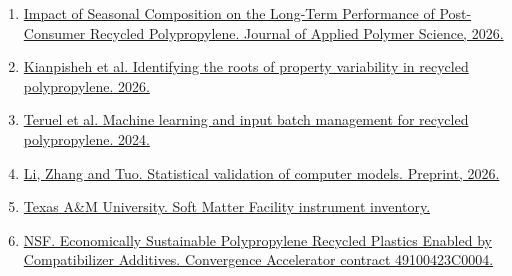 \documentclass[11pt,letterpaper]{article}
\begin{document}
\begin{enumerate}
\small\setlength{\itemsep}{0pt}
\item \href{https://doi.org/10.1002/app.70501}{Impact of Seasonal Composition on the Long-Term Performance of Post-Consumer Recycled Polypropylene. Journal of Applied Polymer Science, 2026.}
\item \href{https://doi.org/10.1016/j.wasman.2026.115586}{Kianpisheh et al. Identifying the roots of property variability in recycled polypropylene. 2026.}
\item \href{https://doi.org/10.1016/j.jclepro.2023.140390}{Teruel et al. Machine learning and input batch management for recycled polypropylene. 2024.}
\item \href{https://arxiv.org/abs/2604.17144}{Li, Zhang and Tuo. Statistical validation of computer models. Preprint, 2026.}
\item \href{https://somf.engr.tamu.edu/instruments/}{Texas A\&M University. Soft Matter Facility instrument inventory.}
\item \href{https://nsf-gov-resources.nsf.gov/2022-12/2022%20Cohort%20Track%20I%20Phase%201%20Award%20Announcements%20-%20Black%20%26%20Decker%20%28u.s.%29%20Inc.508.pdf}{NSF. Economically Sustainable Polypropylene Recycled Plastics Enabled by Compatibilizer Additives. Convergence Accelerator contract 49100423C0004.}
\end{enumerate}
\end{document}
